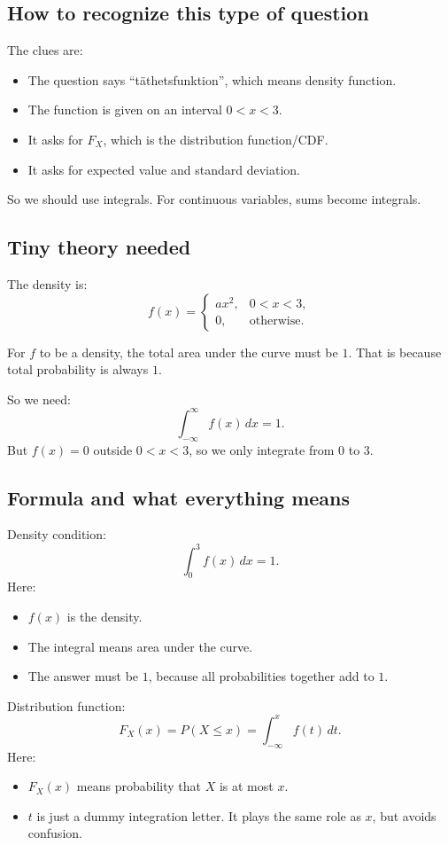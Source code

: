 \documentclass[11pt,a4paper]{article}
\begin{document}
\subsection*{How to recognize this type of question}
The clues are:
\begin{itemize}[leftmargin=*]
    \item The question says ``täthetsfunktion'', which means density function.
    \item The function is given on an interval \(0<x<3\).
    \item It asks for \(F_X\), which is the distribution function/CDF.
    \item It asks for expected value and standard deviation.
\end{itemize}

So we should use integrals. For continuous variables, sums become integrals.

\subsection*{Tiny theory needed}
The density is:
\[
f(x)=
\begin{cases}
ax^2, & 0<x<3,\\
0, & \text{otherwise}.
\end{cases}
\]

For \(f\) to be a density, the total area under the curve must be \(1\). That is because total probability is always \(1\).

So we need:
\[
\int_{-\infty}^{\infty} f(x)\,dx=1.
\]
But \(f(x)=0\) outside \(0<x<3\), so we only integrate from \(0\) to \(3\).

\subsection*{Formula and what everything means}
Density condition:
\[
\int_0^3 f(x)\,dx=1.
\]
Here:
\begin{itemize}[leftmargin=*]
    \item \(f(x)\) is the density.
    \item The integral means area under the curve.
    \item The answer must be \(1\), because all probabilities together add to \(1\).
\end{itemize}

Distribution function:
\[
F_X(x)=P(X\le x)=\int_{-\infty}^{x} f(t)\,dt.
\]
Here:
\begin{itemize}[leftmargin=*]
    \item \(F_X(x)\) means probability that \(X\) is at most \(x\).
    \item \(t\) is just a dummy integration letter. It plays the same role as \(x\), but avoids confusion.
\end{itemize}
\end{document}

